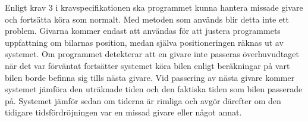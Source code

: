 Enligt krav 3 i kravspecifikationen ska programmet kunna hantera missade givare
och fortsätta köra som normalt. Med metoden som används blir detta inte ett
problem. Givarna kommer endast att användas för att justera programmets
uppfattning om bilarnas position, medan själva positioneringen räknas ut av
systemet. Om programmet detekterar att en givare inte passeras överhuvudtaget när det var förväntat fortsätter systemet köra bilen enligt beräkningar på vart bilen borde befinna sig tills nästa givare. Vid passering av nästa givare kommer systemet jämföra den uträknade tiden och den faktiska tiden som bilen passerade på. Systemet jämför sedan om tiderna är rimliga och avgör därefter om den tidigare tidsfördröjningen var en missad givare eller något annat.

